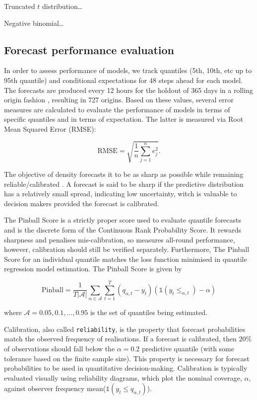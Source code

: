 \documentclass[]{elsarticle} %
\begin{document}
Truncated \(t\) distribution\ldots{}

Negative binomial\ldots{}

\hypertarget{accuracy}{%
\subsection{Forecast performance evaluation}\label{accuracy}}

In order to assess performance of models, we track quantiles (5th, 10th, etc up to 95th quantile) and conditional expectations for 48 steps ahead for each model. The forecasts are produced every 12 hours for the holdout of 365 days in a rolling origin fashion \citep{Tashman2000}, resulting in 727 origins. Based on these values, several error measures are calculated to evaluate the performance of models in terms of specific quantiles and in terms of expectation. The latter is measured via Root Mean Squared Error (RMSE):

\begin{equation}
  \mathrm{RMSE} = \sqrt{\frac{1}{n} \sum_{j=1}^n e_j^2} .
  \label{eq:RMSE}
\end{equation}

The objective of density forecasts it to be as sharp as possible while remaining reliable/calibrated \citep{Gneiting2007a}. A forecast is said to be sharp if the predictive distribution has a relatively small spread, indicating low uncertainty, witch is valuable to decision makers provided the forecast is calibrated.

The Pinball Score is a strictly proper score used to evaluate quantile forecasts and is the discrete form of the Continuous Rank Probability Score. It rewards sharpness and penalises mis-calibration, so measures all-round performance, however, calibration should still be verified separately. Furthermore,
The Pinball Score for an individual quantile matches the loss function minimised in quantile regression model estimation. The Pinball Score is given by

\begin{equation}
    \text{Pinball} = 
    \frac{1}{T|\mathcal{A}|} \sum_{\alpha \in \mathcal{A}} \sum_{t=1}^T
 \left(q_{\alpha,t} - y_{t} \right)
 \left(\mathbb{1}(y_{t}\leq_{\alpha,t})-\alpha \right)
 \label{eq:pinball}
\end{equation}

where \(\mathcal{A} = {0.05,0.1,...,0.95}\) is the set of quantiles being estimated.

Calibration, also called \texttt{reliability}, is the property that forecast probabilities match the observed frequency of realisations. If a forecast is calibrated, then \(20\%\) of observations should fall below the \(\alpha=0.2\) predictive quantile (with some tolerance based on the finite sample size). This property is necessary for forecast probabilities to be used in quantitative decision-making. Calibration is typically evaluated visually using reliability diagrams, which plot the nominal coverage, \(\alpha\), against observer frequency mean(\(\mathbb{1}(y_{t}\le q_{\alpha,t})\)).
\end{document}
